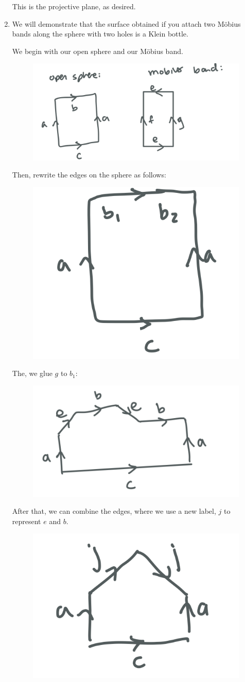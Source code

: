 \documentclass[12pt]{article}
\begin{document}
\begin{enumerate}
This is the projective plane, as desired.

\newpage

\item We will demonstrate that the surface obtained if you attach two Möbius bands along the sphere with two holes is a Klein bottle.

We begin with our open sphere and our Möbius band.

\begin{figure}[h!] 
    \centering
    \includegraphics[width=0.7\linewidth]{2-1.png} 
\end{figure}

Then, rewrite the edges on the sphere as follows:
\begin{figure}[h!] 
    \centering
    \includegraphics[width=0.3\linewidth]{2-2.png} 
\end{figure}

The, we glue $g$ to $b_1$:
\begin{figure}[H] 
    \centering
    \includegraphics[width=0.5\linewidth]{2-3.png} 
\end{figure}

After that, we can combine the edges, where we use a new label, $j$ to represent $e$ and $b$.
\begin{figure}[H] 
    \centering
    \includegraphics[width=0.3\linewidth]{2-4.png} 
\end{figure}


\end{enumerate}
\end{document}
